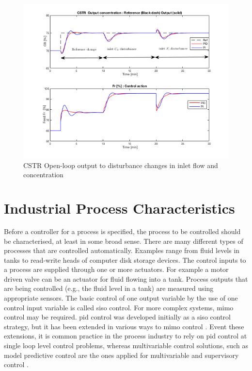 \begin{figure}[tb]
\centering
\includegraphics[width=\linewidth]{../figuras/Ch2FigureClosedLoop}
\caption{CSTR Open-loop output to disturbance changes in inlet flow and concentration} 
\label{Ch2fig:CSTRFigureClosedLoop}
\end{figure}


\section{Industrial Process Characteristics}
\label{sec:2}

Before a controller for a process is specified, the process to be controlled should be characterised, at least in some broad sense. There are many different types of processes that are controlled automatically. Examples range from fluid levels in tanks to read-write heads of computer disk storage devices. The control inputs to a process are supplied through one or more actuators. For example a motor driven valve can be an actuator for fluid flowing into a tank. Process outputs that are being controlled (e.g., the fluid level in a tank) are measured using appropriate sensors. The basic control of one output variable by the use of one control input variable is called \gls{siso} control. For more complex systems, \gls{mimo} control may be required. \gls{pid} control was developed initially as a \gls{siso} control strategy, but it has been extended in various ways to \gls{mimo} control \citep{wang2008}. Event these extensions, it is common practice in the process industry to rely on \gls{pid} control at single loop level control problems, whereas multivariable control solutions, such as model predictive control are the ones applied for multivariable and supervisory control \citep{VilanovaBook2012}.

